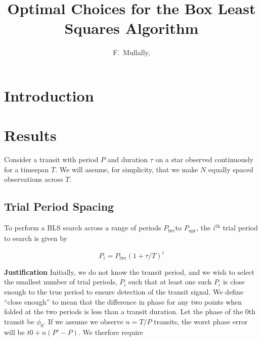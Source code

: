\documentclass[iop,revtex4,twocolappendix]{emulateapj}
\newcommand{\kepler}{{\it Kepler}}
\newcommand{\Plwr}{\ensuremath{P_{\mathrm{lwr}}}}
\newcommand{\Pupr}{\ensuremath{P_{\mathrm{upr}}}}
\begin{document}
\title{Optimal Choices for the Box Least Squares Algorithm}
\shorttitle{\kepler\ False Alarms}

\author{F.~Mullally,
}





\begin{abstract}
\end{abstract}
\keywords{}

\setlength{\parskip}{1.0ex plus0.5ex minus0.2ex}


\section{Introduction}

\section{Results}

Consider a transit with period $P$ and duration $\tau$ on a star observed continuously
for a timespan $T$. We will assume, for simplicity, that we make $N$ equally spaced observations across $T$.

\subsection{Trial Period Spacing}
To perform a BLS search across a range of periods \Plwr to \Pupr, the 
$i^{\mathrm{th}}$ trial period to search is given by

\begin{equation}
P_i = \Plwr(1+ \tau/T)^i
\end{equation}

{\bf Justification}
Initially, we do not know the transit period, and we wish to select the smallest number of trial periods, $P_i$ such that at least one such $P_i$ is close enough to the true period to ensure detection of the transit signal. We define ``close enough'' to mean that the difference in phase for any two points when folded at the two periods is less than a transit duration. Let the phase of the 0th transit be $\phi_0$. If we assume we observe $n = T/P$ transits, the worst phase error will be
$t0 + n(P'-P)$. We therfore require
\end{document}
